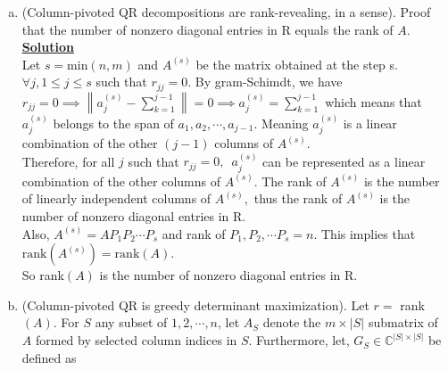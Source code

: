 \documentclass[11pt]{article}
\newcommand{\norm}[1]{\left\lVert#1\right\rVert}
\begin{document}
\begin{enumerate}[(a)]
\item (Column-pivoted QR decompositions are rank-revealing, in  a sense). Proof that the number of nonzero diagonal entries in R equals the rank of $A$.\\
\underline{\textbf{Solution}}\\

Let $s = \text{min}(n, m)$ and $ A^{(s)}$ be the matrix obtained at the step s.\\
$\forall j, 1 \leq j\leq s$ such that $r_{jj} = 0$. By gram-Schimdt, we have $r_{jj} = 0 \implies \norm{a_j^{(s)} - \sum\limits_{k =1}^{j-1}} = 0 \implies a_j^{(s)} = \sum\limits_{k =1}^{j-1}$ which means that $a_j^{(s)}$ belongs to the span of $a_1, a_2, \cdots, a_{j-1}$. Meaning $a_j^{(s)}$ is a linear combination of the other $(j-1)$ columns of $A^{(s)}.$\\
Therefore,  for all $j$ such that $r_{jj} =0,\:\; a_j^{(s)}$ can be represented as a linear combination of the other columns of $A^{(s)}$. The rank of $A^{(s)}$ is the number of linearly independent columns of $A^{(s)},$  thus  the rank of $A^{(s)}$ is the number of nonzero diagonal entries in R.\\
Also, $A^{(s)} = AP_1P_2 \cdots P_s$ and rank of $P_1, P_2, \cdots P_s = n.$ This implies that $\text{rank}(A^{(s)}) = \text{rank}(A).$\\
So rank$(A)$ is the number of nonzero diagonal entries in R.

\item (Column-pivoted QR is greedy determinant maximization). Let $r =$ rank$(A)$. For $S$ any subset of $ {1,2,\cdots, n}$, let $A_S$ denote the $m \times \left|S\right|$ submatrix of $A$ formed by selected column indices in $S$. Furthermore, let, $G_S \in \mathbb{C}^{\left|S\right| \times\left|S\right|}$ be defined as


\end{enumerate}
\end{document}
